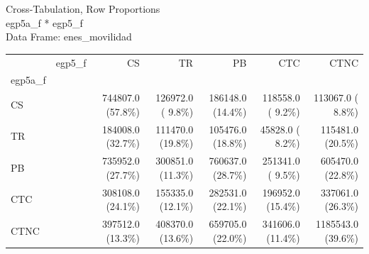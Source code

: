 \documentclass[
]{article}
\newenvironment{Shaded}{\begin{snugshade}}{\end{snugshade}}
\newcommand{\AttributeTok}[1]{\textcolor[rgb]{0.13,0.29,0.53}{#1}}
\newcommand{\ConstantTok}[1]{\textcolor[rgb]{0.56,0.35,0.01}{#1}}
\newcommand{\DecValTok}[1]{\textcolor[rgb]{0.00,0.00,0.81}{#1}}
\newcommand{\FunctionTok}[1]{\textcolor[rgb]{0.13,0.29,0.53}{\textbf{#1}}}
\newcommand{\NormalTok}[1]{#1}
\newcommand{\SpecialCharTok}[1]{\textcolor[rgb]{0.81,0.36,0.00}{\textbf{#1}}}
\newcommand{\StringTok}[1]{\textcolor[rgb]{0.31,0.60,0.02}{#1}}
\begin{document}
\begin{Shaded}
\end{Shaded}

Cross-Tabulation, Row Proportions\\
egp5a\_f * egp5\_f\\
Data Frame: enes\_movilidad

\begin{longtable}[]{@{}lrrrrrr@{}}
\toprule\noalign{}
\endhead
\bottomrule\noalign{}
\endlastfoot
& egp5\_f & CS & TR & PB & CTC & CTNC \\
egp5a\_f & & & & & & \\
CS & & 744807.0 (57.8\%) & 126972.0 ( 9.8\%) & 186148.0 (14.4\%) & 118558.0 ( 9.2\%) & 113067.0 ( 8.8\%) \\
TR & & 184008.0 (32.7\%) & 111470.0 (19.8\%) & 105476.0 (18.8\%) & 45828.0 ( 8.2\%) & 115481.0 (20.5\%) \\
PB & & 735952.0 (27.7\%) & 300851.0 (11.3\%) & 760637.0 (28.7\%) & 251341.0 ( 9.5\%) & 605470.0 (22.8\%) \\
CTC & & 308108.0 (24.1\%) & 155335.0 (12.1\%) & 282531.0 (22.1\%) & 196952.0 (15.4\%) & 337061.0 (26.3\%) \\
CTNC & & 397512.0 (13.3\%) & 408370.0 (13.6\%) & 659705.0 (22.0\%) & 341606.0 (11.4\%) & 1185543.0 (39.6\%) \\
\end{longtable}

\begin{Shaded}
\end{Shaded}
\end{document}
